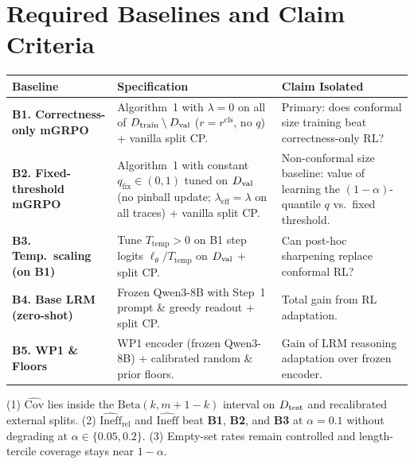 \documentclass[10pt,a4paper]{article}
\begin{document}


\section{Required Baselines and Claim Criteria} \label{sec:baselines}

\smallskip
{\small\renewcommand{\arraystretch}{1.08}%
\noindent\begin{tabularx}{\linewidth}{@{}>{\raggedright\arraybackslash}p{3.4cm} L L@{}}\toprule
\sffamily\bfseries Baseline & \sffamily\bfseries Specification & \sffamily\bfseries Claim Isolated \\\midrule
\textbf{B1. Correctness-only mGRPO} & Algorithm~1 with $\lambda=0$ on all of $D_{\mathrm{train}}\setminus D_{\mathrm{val}}$ ($r=r^{\mathrm{cls}}$, no $q$) + vanilla split CP. & Primary: does conformal size training beat correctness-only RL? \\
\textbf{B2. Fixed-threshold mGRPO} & Algorithm~1 with constant $q_{\mathrm{fix}}\in(0,1)$ tuned on $D_{\mathrm{val}}$ (no pinball update; $\lambda_{\mathrm{eff}}=\lambda$ on all traces) + vanilla split CP. & Non-conformal size baseline: value of learning the $(1-\alpha)$-quantile $q$ vs.\ fixed threshold. \\
\textbf{B3. Temp.\ scaling (on B1)} & Tune $T_{\mathrm{temp}}>0$ on B1 step logits $\ell_\theta/T_{\mathrm{temp}}$ on $D_{\mathrm{val}}$ + split CP. & Can post-hoc sharpening replace conformal RL? \\
\textbf{B4. Base LRM (zero-shot)} & Frozen Qwen3-8B with Step~1 prompt \& greedy readout + split CP. & Total gain from RL adaptation. \\
\textbf{B5. WP1 \& Floors} & WP1 encoder (frozen Qwen3-8B) + calibrated random \& prior floors. & Gain of LRM reasoning adaptation over frozen encoder. \\\bottomrule
\end{tabularx}}
\medskip

\begin{tcolorbox}[critbox,title={Claim Criteria (When WP2 Supports RQ1 \& RQ2)}]
\small
(1) $\widehat{\mathrm{Cov}}$ lies inside the $\mathrm{Beta}(k,m+1-k)$ interval on $D_{\mathrm{test}}$ and recalibrated external splits.
(2) $\widehat{\mathrm{Ineff}}_{\mathrm{rel}}$ and $\widehat{\mathrm{Ineff}}$ beat \textbf{B1}, \textbf{B2}, and \textbf{B3} at $\alpha=0.1$ without degrading at $\alpha\in\{0.05,0.2\}$.
(3) Empty-set rates remain controlled and length-tercile coverage stays near $1-\alpha$.
\end{tcolorbox}
\end{document}

